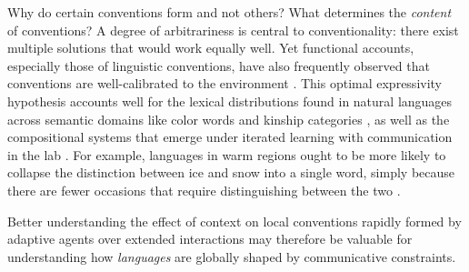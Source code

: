 
Why do certain conventions form and not others?
What determines the \emph{content} of conventions? 
A degree of arbitrariness is central to conventionality: there exist multiple solutions that would work equally well. 
Yet functional accounts, especially those of linguistic conventions, have also frequently observed that conventions are well-calibrated to the environment \cite{}.
This optimal expressivity hypothesis accounts well for the lexical distributions found in natural languages across semantic domains like color words and kinship categories \cite{RegierKempKay15_WordMeaningsEfficientCommunication,GibsonEtAl17_ColorNamingUse}, as well as the compositional systems that emerge under iterated learning with communication in the lab \cite{WintersKirbySmith14_LanguagesAdapt, KirbyTamarizCornishSmith15_CompressionCommunication}. 
For example, languages in warm regions ought to be more likely to collapse the distinction between ice and snow into a single word, simply because there are fewer occasions that require distinguishing between the two \cite{RegierCarstensenKemp16_WordsForSnow}. 

Better understanding the effect of context on local conventions rapidly formed by adaptive agents over extended interactions may therefore be valuable for understanding how \emph{languages} are globally shaped by communicative constraints.


